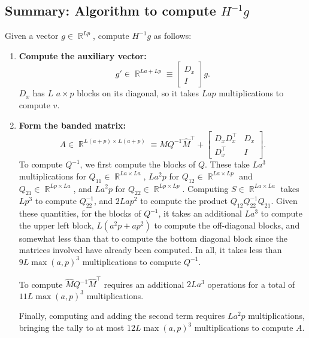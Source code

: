 \documentclass{article}
\newcommand{\R}{\mathop{\mathbb{R}}}
\begin{document}
\subsection*{Summary: Algorithm to compute $H^{-1} g$}

Given a vector $g \in \R^{Lp}$, compute $H^{-1} g$ as follows:

\begin{enumerate}
    \item
          \textbf{Compute the auxiliary vector:}
          \[
              g'  \in \R^{La + Lp} \equiv \begin{bmatrix}
                  D_x \\ I
              \end{bmatrix}
              g.
          \]
          $D_x$ has $L$ $a\times p$ blocks on its diagonal, so it takes $Lap$ multiplications to compute $v$.

    \item
          \textbf{Form the banded matrix:}
          \[
              A \in \R^{L(a+p) \times L(a+p)} \equiv \hat{M} Q^{-1} \hat{M}^\top +
              \begin{bmatrix}
                  D_x D_x^\top & D_x \\ D_x^\top & I
              \end{bmatrix}
              .
          \]
          To compute $Q^{-1}$, we first compute the blocks of $Q$. These take $La^3$ multiplications for $Q_{11} \in \R^{La\times
                  La}$, $La^2p$ for $Q_{12}\in \R^{L a\times Lp}$ and $Q_{21}\in \R^{Lp \times La}$, and $La^2p$ for $Q_{22}\in \R^{Lp
                  \times Lp}$. Computing $S\in \R^{La\times La}$ takes $L p^3$ to compute $Q_{22}^{-1}$, and $2Lap^2$ to compute the
          product $Q_{12} Q_{22}^{-1} Q_{21}$. Given these quantities, for the blocks of $Q^{-1}$, it takes an additional $La^3$
          to compute the upper left block, $L(a^2p+ap^2)$ to compute the off-diagonal blocks, and somewhat less than that to
          compute the bottom diagonal block since the matrices involved have already been computed. In all, it takes less than
          $9L\max(a,p)^3$ multiplications to compute $Q^{-1}$.

          To compute $\hat{M}Q^{-1}\hat{M}^\top$ requires an additional $2La^3$ operations for a total of $11L\max(a,p)^3$
          multiplications.

          Finally, computing and adding the second term requires $La^2p$ multiplications, bringing the tally to at most $12 L
              \max(a,p)^3$ multiplications to compute $A$.


\end{enumerate}
\end{document}
